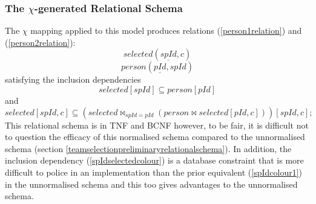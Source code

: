 \subsubsection{The $\chi$-generated Relational Schema}
The $\chi$ mapping applied to this model produces relations (\ref{person1relation}) and (\ref{person2relation}):
\begin{equation}
\label{person1relation}
selected(\underline{spId},  c)
\end{equation}
\begin{equation}
\label{person2relation}
person(\underline{pId}, spId)
\end{equation}
satisfying the inclusion dependencies
\begin{equation}
selected[spId] \subseteq person[pId]
\end{equation}
and
\begin{equation}
\label{spIdselectedcolour}
selected[spId,c] \subseteq (selected \bowtie_{spId=pId} 
                                       (person \bowtie selected [pId,c]) )
																			[spId,c];
\end{equation}
This relational schema is in TNF and BCNF however, to be fair,
it is difficult not to question the efficacy of this normalised schema compared to the unnormalised schema (section \ref{teamselectionpreliminaryrelationalschema}).
In addition,
the inclusion dependency (\ref{spIdselectedcolour}) is a database constraint that
is more difficult to police in an implementation
than the prior equivalent (\ref{spIdcolour1}) in the unnormalised schema and
this too gives advantages to the unnormalised schema. 


